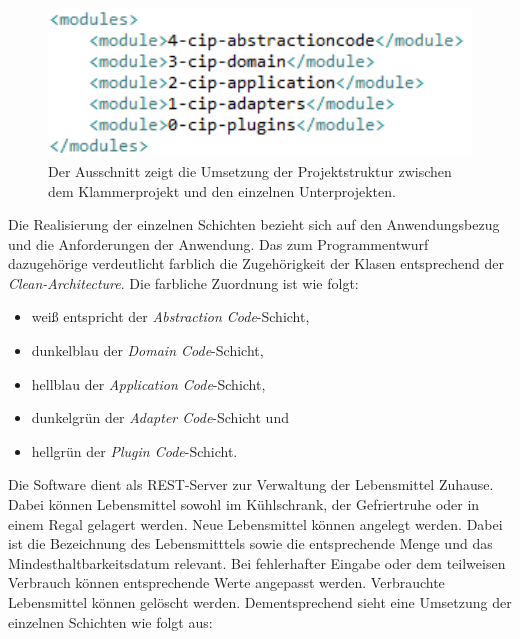 \begin{figure}[H]
	\centering
	\includegraphics[width=1.0\textwidth]{Bilder/ausschnitt-pom.PNG}
	\caption[Ausschnitt aus der pom.xml zur Projektstruktur.]{Der Ausschnitt zeigt die Umsetzung der Projektstruktur zwischen dem Klammerprojekt und den einzelnen Unterprojekten.}
	\label{fig:umsetzung-pom}
\end{figure}

Die Realisierung der einzelnen Schichten bezieht sich auf den Anwendungsbezug und die Anforderungen der Anwendung.
Das zum Programmentwurf dazugehörige \href{http://localhost:4200}{} verdeutlicht farblich die Zugehörigkeit der Klasen entsprechend der \textit{Clean-Architecture}.
Die farbliche Zuordnung ist wie folgt:
\begin{itemize}
    \item weiß entspricht der \textit{Abstraction Code}-Schicht,
    \item dunkelblau der \textit{Domain Code}-Schicht,
    \item hellblau der \textit{Application Code}-Schicht,
    \item dunkelgrün der \textit{Adapter Code}-Schicht und
    \item hellgrün der \textit{Plugin Code}-Schicht.
\end{itemize}


Die Software dient als \ac{REST}-Server zur Verwaltung der Lebensmittel Zuhause.
Dabei können Lebensmittel sowohl im Kühlschrank, der Gefriertruhe oder in einem Regal gelagert werden.
Neue Lebensmittel können angelegt werden.
Dabei ist die Bezeichnung des Lebensmitttels sowie die entsprechende Menge und das Mindesthaltbarkeitsdatum relevant.
Bei fehlerhafter Eingabe oder dem teilweisen Verbrauch können entsprechende Werte angepasst werden.
Verbrauchte Lebensmittel können gelöscht werden.
Dementsprechend sieht eine Umsetzung der einzelnen Schichten wie folgt aus:

